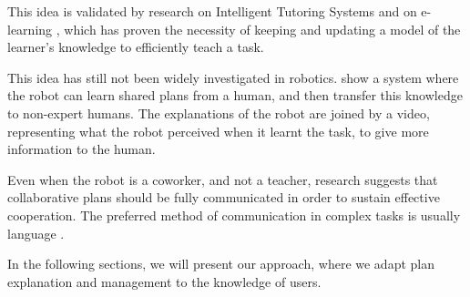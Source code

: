 This idea is validated by research on Intelligent Tutoring Systems \citep{brusilovskiy1994construction}  and on e-learning \citep{brusilovskiy2005}, which has proven  the necessity of keeping and updating a model of the learner's knowledge to efficiently teach a task.

This idea has still not been widely investigated in robotics. \cite{Sorce2015} show a system where the robot can learn shared plans from a human, and then transfer this knowledge to non-expert humans. The explanations of the robot are joined by a video, representing what the robot perceived when it learnt the task, to give more information to the human.

Even when the robot is a coworker, and not a teacher, research \citep{Lallee2013} suggests that collaborative plans should be fully communicated in order to sustain effective cooperation. The preferred method of communication in complex tasks is usually language \citep{Warneken2006,Warneken2007}.

In the following sections, we will present our approach, where we adapt plan explanation and management to the knowledge of users.






